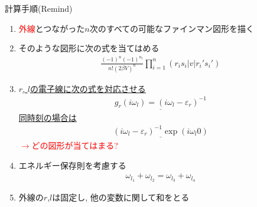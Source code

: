 \documentclass[dvipdfmx,10pt]{beamer}
\begin{document}
\begin{frame}{計算手順(Remind)}
    \footnotesize
    \begin{enumerate}
        \item \textcolor{red}{外線}とつながった$n$次のすべての可能なファインマン図形を描く
        \item そのような図形に次の式を当てはめる
        \begin{align*}
            \frac{(-1)^n(-1)^{n_l}}{n!(2\beta V)^n}\prod_{i=1}^{n}\left(r_is_i|v|r_i's_i'\right)
        \end{align*}
        \item \underline{$r$, $l$の電子線に次の式を対応させる}
        \begin{align*}
            \underline{g_r(i\omega_l) = (i\omega_l-\varepsilon_r)^{-1}}
        \end{align*}
        \underline{同時刻の場合は}
        \begin{align*}
            \underline{(i\omega_l-\varepsilon_r)^{-1}\exp(i\omega_l0)}
        \end{align*}
        \textcolor{red}{$\rightarrow$どの図形が当てはまる?}
        \item エネルギー保存則を考慮する
        \begin{align*}
            \omega_{l_1} + \omega_{l_2} = \omega_{l_3} + \omega_{l_4}
        \end{align*}
        \item 外線の$r$,$l$は固定し, 他の変数に関して和をとる
    \end{enumerate}
    \normalsize
\end{frame}
\end{document}
